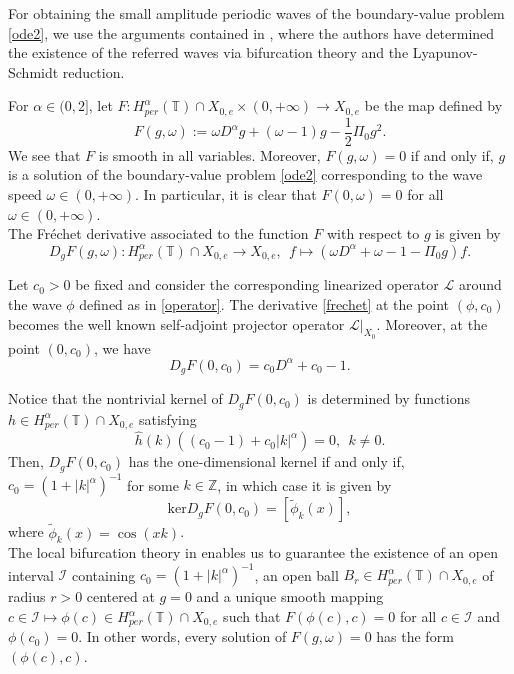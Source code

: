 \documentclass[12pt,reqno]{amsart}
\newcommand{\2}{L^2_{per}(0, T)}
\numberwithin{equation}{section}
\numberwithin{figure}{section}
\begin{document}
For obtaining the small amplitude periodic waves of the boundary-value problem \eqref{ode2}, we use the arguments contained in \cite[Chapter 8.4]{buffoni}, where the authors have determined the existence of the referred waves via bifurcation theory and the Lyapunov-Schmidt reduction.

 For $\alpha \in (0, 2]$, let $F: H^{\alpha}_{per}(\mathbb{T})\cap X_{0,e} \times  (0, + \infty) \rightarrow  X_{0,e}$ be the map defined by
	\begin{equation}
	F(g, \omega):= \omega D^{\alpha}g + (\omega -1)g - \frac{1}{2}\Pi_0g^2.
	\end{equation}
We see that $F$ is smooth in all variables. Moreover, $F(g, \omega) =0$ if and only if, $g$ is a solution of the boundary-value problem \eqref{ode2} corresponding to the wave speed $\omega \in (0,+\infty)$. In particular, it is clear that $F(0, \omega)=0$ for all $\omega \in (0, +\infty)$. \\
\indent The Fr\'echet derivative associated to the function $F$ with respect to $g$ is given by
	\begin{equation}\label{frechet}
	D_{g}F(g, \omega): H^{\alpha}_{per}(\mathbb{T})\cap X_{0,e} \rightarrow  X_{0,e}, \ \ f \mapsto (\omega D^{\alpha} + \omega-1 - \Pi_0 g)f.
	\end{equation}

Let $c_0>0$ be fixed and consider the corresponding linearized operator $\mathcal{L}$ around the wave $\phi$ defined as in \eqref{operator}. The derivative \eqref{frechet} at the point $(\phi, c_0)$ becomes the well known self-adjoint projector operator $\mathcal{L}|_{X_0}$. Moreover, at the point $(0, c_0)$,  we have
	\begin{equation}
	D_{g}F(0,c_0)= c_0D^{\alpha} + c_0 -1 .
	\end{equation}

Notice that the nontrivial kernel of $D_{g}F(0,c_0)$ is determined by  functions $h \in  H^{\alpha}_{per}(\mathbb{T}) \cap X_{0,e}$ satisfying
	\begin{equation}
	\widehat{h}(k)((c_0-1)+c_0|k|^{\alpha}) =0, \ \ k \neq 0.
	\end{equation}
Then, $D_{g}F(0, c_0)$ has the one-dimensional kernel if and only  if, $c_0 = (1+ |k|^{\alpha})^{-1}$ for some $k\in \mathbb{Z}$, in which case it is given by
	\begin{equation}
	\textrm{ker} D_{g}F(0,c_0) = [\tilde{\phi}_k(x)],
	\end{equation}
where $\tilde{\phi}_k(x) = \cos(xk)$.\\
\indent The local bifurcation theory in \cite[Chapter 8.4]{buffoni} enables us to guarantee the existence of an open interval $\mathcal{I}$ containing $c_0 = (1+ |k|^{\alpha})^{-1}$, an open ball $B_r \in H^{\alpha}_{per}(\mathbb{T}) \cap X_{0,e}$ of radius $r>0$ centered at $g=0$ and a unique smooth mapping $c\in \mathcal{I} \mapsto \phi (c) \in H^{\alpha}_{per}(\mathbb{T}) \cap X_{0,e}$ such that $F(\phi(c), c) = 0$ for all $c \in \mathcal{I}$ and $\phi(c_0)=0$. In other words, every solution of $F(g, \omega)=0$ has the form $(\phi(c),c)$.
\end{document}
